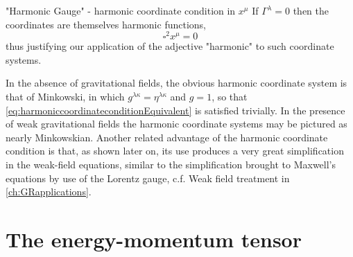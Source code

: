 \begin{mybox}{"Harmonic Gauge" - harmonic coordinate condition in $x^\mu$}
	If $\Gamma^\lambda=0$ then the coordinates are themselves harmonic functions,
	\begin{equation}
	\label{eq:harmonicCoordinatesGauge}
	\square^2 x^\mu = 0
	\end{equation}
	thus justifying our application of the adjective "harmonic" to such coordinate systems.
\end{mybox}
In the absence of gravitational fields, the obvious harmonic coordinate system is that of Minkowski, in which $g^{\lambda \kappa} = \eta^{\lambda \kappa}$ and $g=1$, so that \ref{eq:harmoniccoordinateconditionEquivalent} is satisfied trivially. In the presence of weak gravitational fields the harmonic coordinate systems may be pictured as nearly Minkowskian. Another related advantage of the harmonic coordinate condition is that, as shown later on, its use produces a very great simplification in the weak-field equations, similar to the simplification brought to Maxwell's equations by use of the Lorentz gauge, c.f. Weak field treatment in \ref{ch:GRapplications}.








\section{The energy-momentum tensor}

